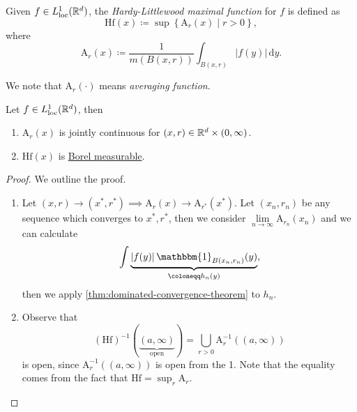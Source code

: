 \begin{definition}\label{def:HL-maximal-function}
	Given \(f\in L^1_{\text{loc} }(\mathbb{\MakeUppercase{r}} ^d)\), the \emph{Hardy-Littlewood maximal function} for \(f\) is defined as
	\[
		\mathrm{Hf}(x) \coloneqq \sup \left\{\mathrm{A}_r(x)\mid r > 0\right\},
	\]
	where
	\[
		\mathrm{A}_r(x) \coloneqq \frac{1}{m(B(x, r))}\int _{B(x, r)} \left\vert f(y) \right\vert \,\mathrm{d}y.
	\]
\end{definition}
\begin{note}
	We note that \(\mathrm{A}_r(\cdot) \) means \emph{averaging function}.
\end{note}
\begin{lemma}\label{lma:lec21}
	Let \(f\in L^1_{\text{loc} }(\mathbb{\MakeUppercase{r}} ^d)\), then
	\begin{enumerate}
		\item \(\mathrm{A}_r(x)\) is jointly continuous for \((x, r)\in \mathbb{\MakeUppercase{r}} ^d \times (0, \infty )\).
		\item \(\mathrm{Hf}(x) \) is \hyperref[def:Borel-measurable]{Borel measurable}.
	\end{enumerate}
\end{lemma}
\begin{proof}
	We outline the proof.
	\begin{enumerate}
		\item Let \((x, r)\to (x^\ast, r^\ast)\implies \mathrm{A}_r(x)\to \mathrm{A}_{r^\ast}(x^\ast)\). Let \((x_{n} , r_{n} )\) be any sequence which converges to
		      \(x^\ast, r^\ast\), then we consider \(\lim\limits_{n \to \infty} \mathrm{A}_{r_{n} }(x_{n} )\) and we can calculate
		      \[
			      \int\underbrace{\left\vert f(y) \right\vert \mathbbm{1}_{B(x_{n} , r_{n} )} (y)}_{\coloneqq h_{n} (y)},
		      \]
		      then we apply \autoref{thm:dominated-convergence-theorem} to \(h_{n} \).
		\item Observe that
		      \[
			      (\mathrm{Hf})^{-1} (\underbrace{(a, \infty )}_{\text{open} }) = \bigcup\limits_{r>0} \mathrm{A}_{r} ^{-1} \left((a, \infty )\right)
		      \]
		      is open, since \(\mathrm{A} _{r} ^{-1} \left((a, \infty )\right)\) is open from the 1. Note that the equality comes from the fact that \(\mathrm{Hf} = \sup_{r} \mathrm{A} _{r} \).
	\end{enumerate}
\end{proof}


